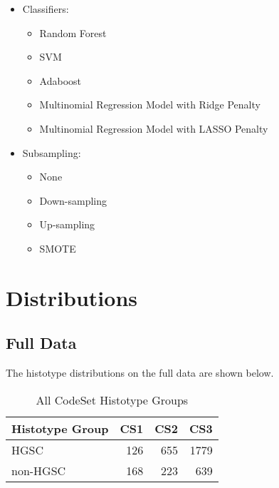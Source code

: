\documentclass[
]{report}
\providecommand{\tightlist}{%
  \setlength{\itemsep}{0pt}\setlength{\parskip}{0pt}}
\begin{document}
\begin{itemize}
\item
  Classifiers:

  \begin{itemize}
  \tightlist
  \item
    Random Forest
  \item
    SVM
  \item
    Adaboost
  \item
    Multinomial Regression Model with Ridge Penalty
  \item
    Multinomial Regression Model with LASSO Penalty
  \end{itemize}
\item
  Subsampling:

  \begin{itemize}
  \tightlist
  \item
    None
  \item
    Down-sampling
  \item
    Up-sampling
  \item
    SMOTE
  \end{itemize}
\end{itemize}

\hypertarget{distributions}{%
\chapter{Distributions}\label{distributions}}

\hypertarget{full-data}{%
\section{Full Data}\label{full-data}}

The histotype distributions on the full data are shown below.

\begin{table}

\caption{\label{tab:dist-all-hist-gr}All CodeSet Histotype Groups}
\centering
\begin{tabular}[t]{l|r|r|r}
\hline
Histotype Group & CS1 & CS2 & CS3\\
\hline
HGSC & 126 & 655 & 1779\\
\hline
non-HGSC & 168 & 223 & 639\\
\hline
\end{tabular}
\end{table}
\end{document}
